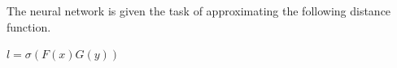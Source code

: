 \documentclass{article}
\begin{document}
%
%
%
%
%
%
%


%
%


The neural network is given the task of approximating the following distance function. 


$l = \sigma(F(x) G(y))$


{}

\end{document}
